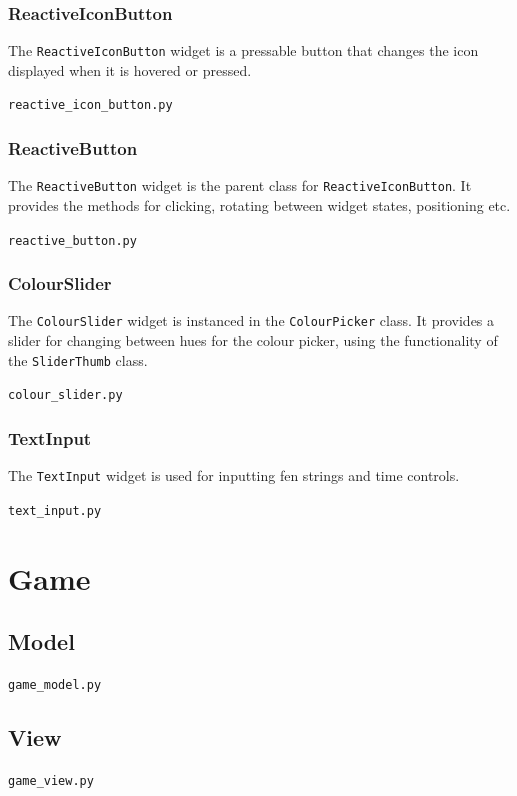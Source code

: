 \documentclass[../main/main.tex]{subfiles}
\begin{document}
\subsubsection*{ReactiveIconButton}
\noindent The \lstinline{ReactiveIconButton} widget is a pressable button that changes the icon displayed when it is hovered or pressed.

\noindent\verb|reactive_icon_button.py|


\subsubsection*{ReactiveButton}
\noindent The \lstinline{ReactiveButton} widget is the parent class for \lstinline{ReactiveIconButton}. It provides the methods for clicking, rotating between widget states, positioning etc.

\noindent\verb|reactive_button.py|


\subsubsection*{ColourSlider}
\noindent The \lstinline{ColourSlider} widget is instanced in the \lstinline{ColourPicker} class. It provides a slider for changing between hues for the colour picker, using the functionality of the \lstinline{SliderThumb} class.

\noindent\verb|colour_slider.py|


\subsubsection*{TextInput}
\noindent The \lstinline{TextInput} widget is used for inputting fen strings and time controls.

\noindent\verb|text_input.py|


\section{Game}
\subsection{Model}
\noindent\verb|game_model.py|


\subsection{View}
\noindent\verb|game_view.py|

\end{document}
